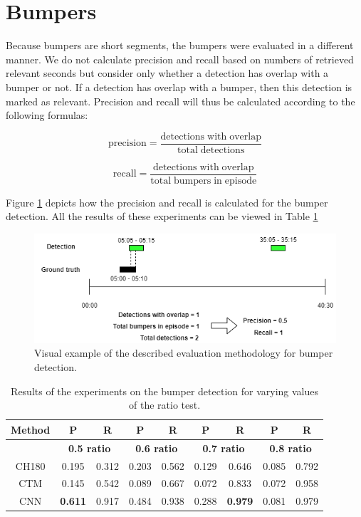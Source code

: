 \documentclass{report}
\begin{document}
\section{Bumpers}
Because bumpers are short segments, the bumpers were evaluated in a different manner. We do not calculate precision and recall based on numbers of retrieved relevant seconds but consider only whether a detection has overlap with a bumper or not. If a detection has overlap with a bumper, then this detection is marked as relevant. Precision and recall will thus be calculated according to the following formulas:

\[\mathrm{precision} = \frac{\mathrm{detections\;with\;overlap}}{\mathrm{total\;detections}}\]

\[\mathrm{recall} = \frac{\mathrm{detections\;with\;overlap}}{\mathrm{total\;bumpers\;in\;episode}}\]

Figure \ref{fig:evaluation-example-bumpers} depicts how the precision and recall is calculated for the bumper detection. All the results of these experiments can be viewed in Table \ref{table:resultsbumpers}

\begin{figure}[H]
	\includegraphics[width=\textwidth]{images/evaluation-bumpers.png}
	\centering
	\caption{Visual example of the described evaluation methodology for bumper detection.}
	\label{fig:evaluation-example-bumpers}
\end{figure}

\begin{table}[H]
	\begin{center}
		\begin{tabular}{ c c c c c c c c c} 
			\hline
			\textbf{Method} & \textbf{P} & \textbf{R} & \textbf{P} & \textbf{R} & \textbf{P} & \textbf{R} & \textbf{P} & \textbf{R} \\
			\hline
			& \multicolumn{2}{c}{\textbf{0.5 ratio}} & \multicolumn{2}{c}{\textbf{0.6 ratio}} & \multicolumn{2}{c}{\textbf{0.7 ratio}} & \multicolumn{2}{c}{\textbf{0.8 ratio}} \\
			\hline
			CH180 			& 0.195				& 0.312 		& 0.203		& 0.562		& 0.129		& 0.646 	& 0.085 	& 0.792 \\
			CTM 			&  0.145			& 0.542 		& 0.089		& 0.667 	& 0.072		& 0.833 	& 0.072 	& 0.958 \\
			CNN 			& \textbf{0.611}	& 0.917			& 0.484		& 0.938 	& 0.288		& \textbf{0.979} 	& 0.081 	& 0.979 \\
			\hline
		\end{tabular}
	\end{center}
	\caption{Results of the experiments on the bumper detection for varying values of the ratio test.}
	\label{table:resultsbumpers}
\end{table}
\end{document}
